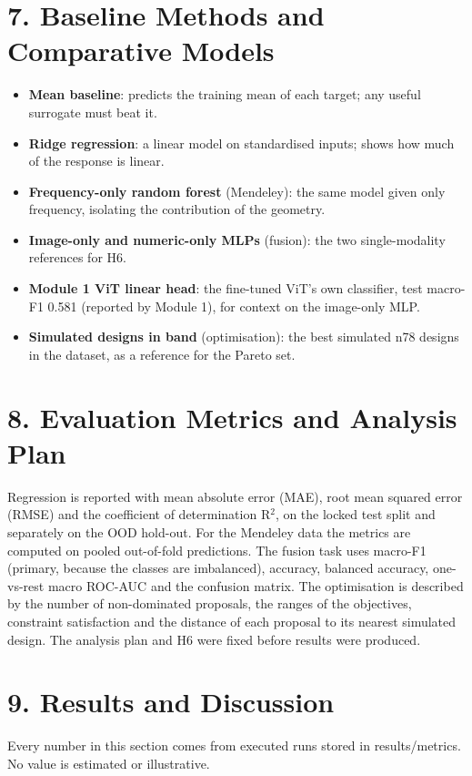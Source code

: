 \documentclass[11pt,a4paper]{article}
\begin{document}
\section*{7. Baseline Methods and Comparative Models}
\begin{itemize}[leftmargin=*,itemsep=1pt]
\item \textbf{Mean baseline}: predicts the training mean of each target; any useful surrogate must beat it.
\item \textbf{Ridge regression}: a linear model on standardised inputs; shows how much of the response is linear.
\item \textbf{Frequency-only random forest} (Mendeley): the same model given only frequency, isolating the contribution of the geometry.
\item \textbf{Image-only and numeric-only MLPs} (fusion): the two single-modality references for H6.
\item \textbf{Module 1 ViT linear head}: the fine-tuned ViT's own classifier, test macro-F1 0.581 (reported by Module 1), for context on the image-only MLP.
\item \textbf{Simulated designs in band} (optimisation): the best simulated n78 designs in the dataset, as a reference for the Pareto set.
\end{itemize}
\section*{8. Evaluation Metrics and Analysis Plan}
Regression is reported with mean absolute error (MAE), root mean squared error (RMSE) and the coefficient of determination R$^2$, on the locked test split and separately on the OOD hold-out. For the Mendeley data the metrics are computed on pooled out-of-fold predictions. The fusion task uses macro-F1 (primary, because the classes are imbalanced), accuracy, balanced accuracy, one-vs-rest macro ROC-AUC and the confusion matrix. The optimisation is described by the number of non-dominated proposals, the ranges of the objectives, constraint satisfaction and the distance of each proposal to its nearest simulated design. The analysis plan and H6 were fixed before results were produced.

\section*{9. Results and Discussion}
Every number in this section comes from executed runs stored in results/metrics. No value is estimated or illustrative.
\end{document}
